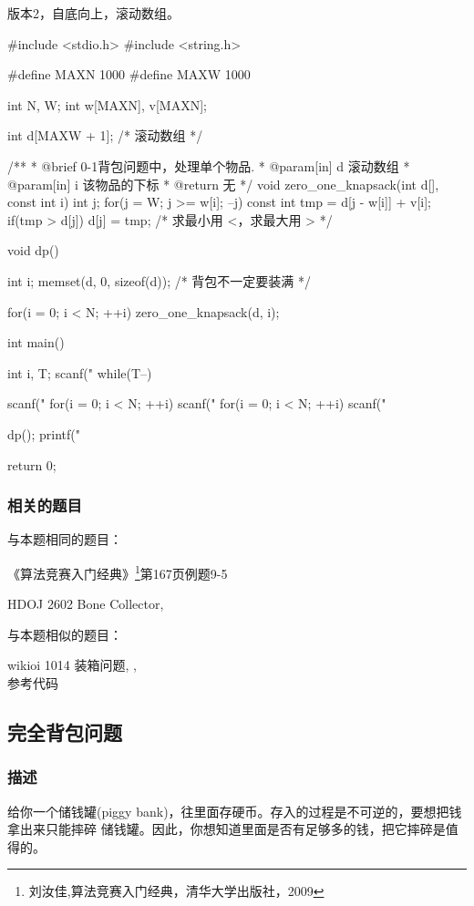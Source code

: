 版本2，自底向上，滚动数组。

\begin{Codex}[label=01knapsack2.c]
#include <stdio.h>
#include <string.h>

#define MAXN 1000
#define MAXW 1000

int N, W;
int w[MAXN], v[MAXN];

int d[MAXW + 1]; /* 滚动数组 */

/**
 * @brief 0-1背包问题中，处理单个物品.
 * @param[in] d 滚动数组
 * @param[in] i 该物品的下标
 * @return 无
 */
void zero_one_knapsack(int d[], const int i) {
    int j;
    for(j = W; j >= w[i]; --j) {
        const int tmp = d[j - w[i]] + v[i];
        if(tmp > d[j]) d[j] = tmp; /* 求最小用 <，求最大用 > */
    }
}

void dp() {
    int i;
    memset(d, 0, sizeof(d)); /* 背包不一定要装满 */

    for(i = 0; i < N; ++i) zero_one_knapsack(d, i);
}

int main() {
    int i, T;
    scanf("%
    while(T--) {
        scanf("%
        for(i = 0; i < N; ++i) scanf("%
        for(i = 0; i < N; ++i) scanf("%

        dp();
        printf("%
    }
    return 0;
}
\end{Codex}

\subsubsection{相关的题目}
与本题相同的题目：
\begindot
\item 《算法竞赛入门经典》\footnote{刘汝佳,算法竞赛入门经典，清华大学出版社，2009}第167页例题9-5
\item  HDOJ 2602 Bone Collector, 
\myenddot

与本题相似的题目：
\begindot
\item  wikioi 1014 装箱问题, , \\
参考代码 
\myenddot

\subsection{完全背包问题}
\label{sec:ukp}

\subsubsection{描述}
给你一个储钱罐(piggy bank)，往里面存硬币。存入的过程是不可逆的，要想把钱拿出来只能摔碎
储钱罐。因此，你想知道里面是否有足够多的钱，把它摔碎是值得的。

